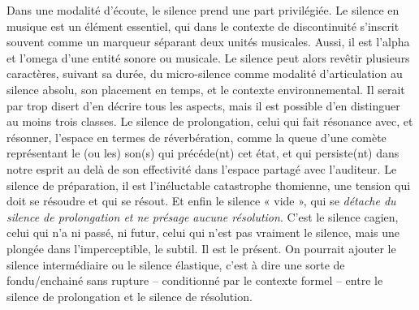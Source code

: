 Dans une modalité d'écoute, le silence prend une part privilégiée. 
Le silence en musique est un élément essentiel, qui dans le contexte de discontinuité s'inscrit souvent comme un marqueur séparant deux unités musicales. Aussi, il est l'alpha et l'omega d'une entité sonore ou musicale. Le silence peut alors revêtir plusieurs caractères, suivant sa durée, du micro-silence comme modalité d'articulation au silence absolu, son placement en temps, et le contexte environnemental. Il serait par trop disert d'en décrire tous les aspects, mais il est possible d'en distinguer au moins trois classes. Le silence de prolongation, celui qui fait résonance avec, et résonner, l'espace en termes de réverbération, comme la queue d'une comète représentant le (ou les) son(s) qui précéde(nt) cet état, et qui persiste(nt) dans notre esprit au delà de son effectivité dans l'espace partagé avec l'auditeur. %
Le silence de préparation, il est l'inéluctable catastrophe thomienne, une tension qui doit se résoudre et qui se résout. Et enfin le silence « vide », qui se \textit{détache du silence de prolongation et ne présage aucune résolution}. %
C'est le silence cagien, celui qui n'a ni passé, ni futur, celui qui n'est pas vraiment le silence, mais une plongée dans l'imperceptible, le subtil. Il est le présent.
On pourrait ajouter le silence intermédiaire ou le silence élastique, c'est à dire une sorte de fondu/enchainé sans rupture -- conditionné par le contexte formel -- entre le silence de prolongation et le silence de résolution.

